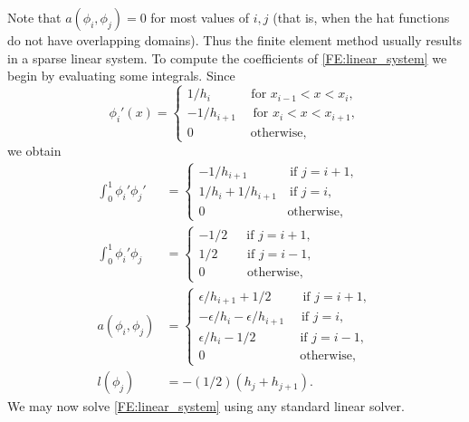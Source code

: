Note that $a(\phi_i,\phi_j) = 0$ for most values of $i, j$ (that is, when the hat functions do not have overlapping domains).  Thus the finite element method usually results in a sparse linear system. 
To compute the coefficients of \eqref{FE:linear_system} we begin by evaluating some integrals. Since
\[
\phi_i'(x) = \begin{cases}
1/h_i \quad \quad \quad \, \text{for } x_{i-1} < x < x_i,\\
 -1/h_{i+1} \quad \text{ for } x_{i} < x < x_{i+1},\\
0 \quad \quad \quad \quad \, \text{ otherwise},
\end{cases}
\]
we obtain  
\begin{align*}
\int_0^1  \phi_i'\phi_j' &= \begin{cases}
- 1/h_{i+1} \quad \quad \quad \text{ if } j=i+1,\\
1/h_i + 1/h_{i+1} \quad \text{if } j=i,\\
0 \quad \quad \quad \quad \quad \quad \, \text{ otherwise},
\end{cases} \\
\int_0^1  \phi_i'\phi_j &= \begin{cases}
- 1/2 \quad \,\text{ if } j=i+1,\\
1/2 \quad \quad \text{ if } j=i-1,\\
0 \quad \quad \quad \text{ otherwise},
\end{cases} \\
a(\phi_i,\phi_j) &= \begin{cases}
\epsilon/h_{i+1} + 1/2 \quad \quad \, \text{ if } j=i+1,\\
-\epsilon/h_i -\epsilon/h_{i+1} \quad  \text{ if } j=i,\\
\epsilon/h_i - 1/2 \quad \quad \quad \, \text{ if } j=i-1,\\
0 \quad \quad \quad \quad \quad \quad \,\,\,\,\,\,\, \text{ otherwise},
\end{cases}\\
l(\phi_j) &= -(1/2)(h_j + h_{j+1}).
\end{align*}
We may now solve \eqref{FE:linear_system} using any standard linear solver. 

